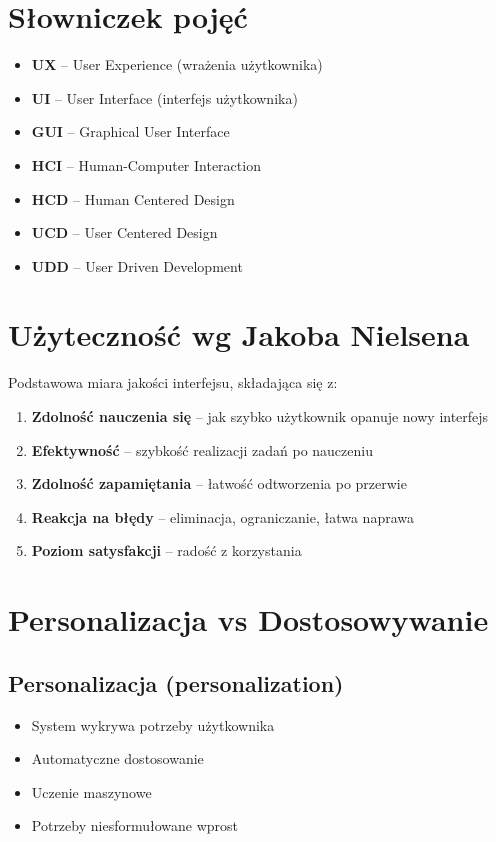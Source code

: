 \section{Słowniczek pojęć}

\begin{itemize}
    \item \textbf{UX} -- User Experience (wrażenia użytkownika)
    \item \textbf{UI} -- User Interface (interfejs użytkownika)
    \item \textbf{GUI} -- Graphical User Interface
    \item \textbf{HCI} -- Human-Computer Interaction
    \item \textbf{HCD} -- Human Centered Design
    \item \textbf{UCD} -- User Centered Design
    \item \textbf{UDD} -- User Driven Development
\end{itemize}

\section{Użyteczność wg Jakoba Nielsena}

Podstawowa miara jakości interfejsu, składająca się z:

\begin{enumerate}
    \item \textbf{Zdolność nauczenia się} -- jak szybko użytkownik opanuje nowy interfejs
    \item \textbf{Efektywność} -- szybkość realizacji zadań po nauczeniu
    \item \textbf{Zdolność zapamiętania} -- łatwość odtworzenia po przerwie
    \item \textbf{Reakcja na błędy} -- eliminacja, ograniczanie, łatwa naprawa
    \item \textbf{Poziom satysfakcji} -- radość z korzystania
\end{enumerate}

\section{Personalizacja vs Dostosowywanie}

\subsection{Personalizacja (personalization)}
\begin{itemize}
    \item System wykrywa potrzeby użytkownika
    \item Automatyczne dostosowanie
    \item Uczenie maszynowe
    \item Potrzeby niesformułowane wprost
\end{itemize}

